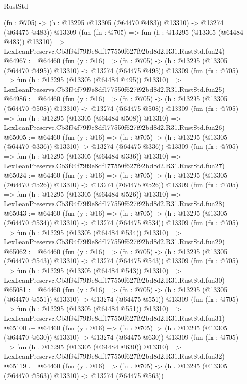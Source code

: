 \begin{lexlean}{RustStd}
\begin{coremodule}
    (fn : @705) -> (h : @13295 (@13305 (@64470 @483)) @13310) -> @13274 (@64475 @483))
    @13309
    (fun (fn : @705) =>
    fun (h : @13295 (@13305 (@64484 @483)) @13310) =>
    LexLeanPreserve.Cb3f94f79f9e8df177550f627f92bd8d2.R31.RustStd.fun24)
@64967 := @64460
    (fun (y : @16) =>
    (fn : @705) -> (h : @13295 (@13305 (@64470 @495)) @13310) -> @13274 (@64475 @495))
    @13309
    (fun (fn : @705) =>
    fun (h : @13295 (@13305 (@64484 @495)) @13310) =>
    LexLeanPreserve.Cb3f94f79f9e8df177550f627f92bd8d2.R31.RustStd.fun25)
@64986 := @64460
    (fun (y : @16) =>
    (fn : @705) -> (h : @13295 (@13305 (@64470 @508)) @13310) -> @13274 (@64475 @508))
    @13309
    (fun (fn : @705) =>
    fun (h : @13295 (@13305 (@64484 @508)) @13310) =>
    LexLeanPreserve.Cb3f94f79f9e8df177550f627f92bd8d2.R31.RustStd.fun26)
@65005 := @64460
    (fun (y : @16) =>
    (fn : @705) -> (h : @13295 (@13305 (@64470 @336)) @13310) -> @13274 (@64475 @336))
    @13309
    (fun (fn : @705) =>
    fun (h : @13295 (@13305 (@64484 @336)) @13310) =>
    LexLeanPreserve.Cb3f94f79f9e8df177550f627f92bd8d2.R31.RustStd.fun27)
@65024 := @64460
    (fun (y : @16) =>
    (fn : @705) -> (h : @13295 (@13305 (@64470 @526)) @13310) -> @13274 (@64475 @526))
    @13309
    (fun (fn : @705) =>
    fun (h : @13295 (@13305 (@64484 @526)) @13310) =>
    LexLeanPreserve.Cb3f94f79f9e8df177550f627f92bd8d2.R31.RustStd.fun28)
@65043 := @64460
    (fun (y : @16) =>
    (fn : @705) -> (h : @13295 (@13305 (@64470 @534)) @13310) -> @13274 (@64475 @534))
    @13309
    (fun (fn : @705) =>
    fun (h : @13295 (@13305 (@64484 @534)) @13310) =>
    LexLeanPreserve.Cb3f94f79f9e8df177550f627f92bd8d2.R31.RustStd.fun29)
@65062 := @64460
    (fun (y : @16) =>
    (fn : @705) -> (h : @13295 (@13305 (@64470 @543)) @13310) -> @13274 (@64475 @543))
    @13309
    (fun (fn : @705) =>
    fun (h : @13295 (@13305 (@64484 @543)) @13310) =>
    LexLeanPreserve.Cb3f94f79f9e8df177550f627f92bd8d2.R31.RustStd.fun30)
@65081 := @64460
    (fun (y : @16) =>
    (fn : @705) -> (h : @13295 (@13305 (@64470 @551)) @13310) -> @13274 (@64475 @551))
    @13309
    (fun (fn : @705) =>
    fun (h : @13295 (@13305 (@64484 @551)) @13310) =>
    LexLeanPreserve.Cb3f94f79f9e8df177550f627f92bd8d2.R31.RustStd.fun31)
@65100 := @64460
    (fun (y : @16) =>
    (fn : @705) -> (h : @13295 (@13305 (@64470 @630)) @13310) -> @13274 (@64475 @630))
    @13309
    (fun (fn : @705) =>
    fun (h : @13295 (@13305 (@64484 @630)) @13310) =>
    LexLeanPreserve.Cb3f94f79f9e8df177550f627f92bd8d2.R31.RustStd.fun32)
@65119 := @64460
    (fun (y : @16) =>
    (fn : @705) -> (h : @13295 (@13305 (@64470 @563)) @13310) -> @13274 (@64475 @563))

\end{coremodule}
\end{lexlean}
